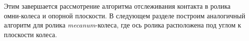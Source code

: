 

Этим завершается рассмотрение алгоритма отслеживания контакта в ролика омни-колеса и опорной плоскости. В следующем разделе построим аналогичный алгоритм для ролика \textit{mecanum}-колеса, где ось ролика расположена под углом к плоскости колеса.